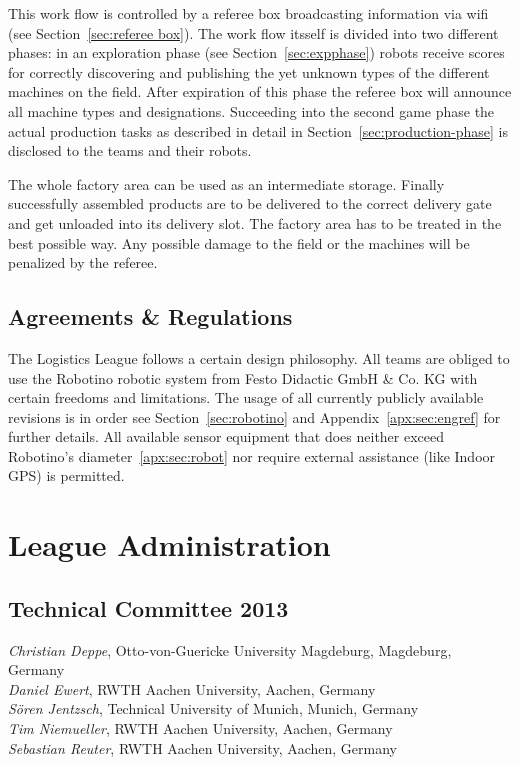 \documentclass[12pt,twoside]{article}
\newcommand{\refsec}[1]{Section~\ref{#1}}
\begin{document}
This work flow is controlled by a referee box broadcasting information
via wifi (see \refsec{sec:referee box}). The work flow itsself is
divided into two different phases: in an exploration phase (see
\refsec{sec:expphase}) robots receive scores for correctly discovering
and publishing the yet unknown types of the different machines on the
field. After expiration of this phase the referee box will announce all
machine types and designations. Succeeding into the second game phase
the actual production tasks as described in detail in
\refsec{sec:production-phase} is disclosed to the teams and their
robots.

The whole factory area can be used as an intermediate storage. Finally
successfully assembled products are to be delivered to the correct
delivery gate and get unloaded into its delivery slot. The factory area
has to be treated in the best possible way. Any possible damage to the
field or the machines will be penalized by the referee.

\subsection{Agreements \& Regulations} \label{sec:agreements}

The Logistics League follows a certain design philosophy. All teams are
obliged to use the Robotino robotic system from Festo Didactic GmbH \&
Co. KG with certain freedoms and limitations. The usage of all
currently publicly available revisions is in order see
\refsec{sec:robotino} and Appendix~\ref{apx:sec:engref} for further
details. All available sensor equipment that does neither exceed
Robotino's diameter~\ref{apx:sec:robot}  nor require external
assistance (like Indoor GPS) is permitted.




\section{League Administration} \label{sec:commitees}
\subsection{Technical Committee 2013} \label{sec:tc}
\emph{Christian Deppe}, Otto-von-Guericke University Magdeburg, Magdeburg,
Germany\\
\emph{Daniel Ewert}, RWTH Aachen University, Aachen, Germany\\
\emph{S\"oren Jentzsch}, Technical University of Munich, Munich, Germany\\
\emph{Tim Niemueller}, RWTH Aachen University, Aachen, Germany\\
\emph{Sebastian Reuter}, RWTH Aachen University, Aachen, Germany
\end{document}
